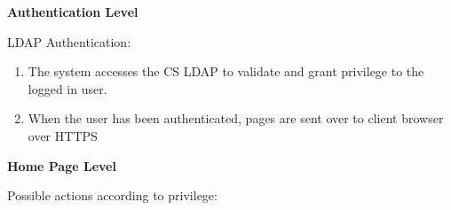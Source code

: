 \documentclass{article}
\begin{document}
\noindent 

\noindent \textbf{Authentication Level}

\noindent LDAP Authentication:  

\begin{enumerate}
\item  The system accesses the CS LDAP to validate and grant privilege to the logged in user. 

\item  When the user has been authenticated, pages are sent over to client browser over HTTPS 
\end{enumerate}

\noindent 

\noindent \textbf{Home Page Level}

\noindent Possible actions according to privilege:  
\end{document}
